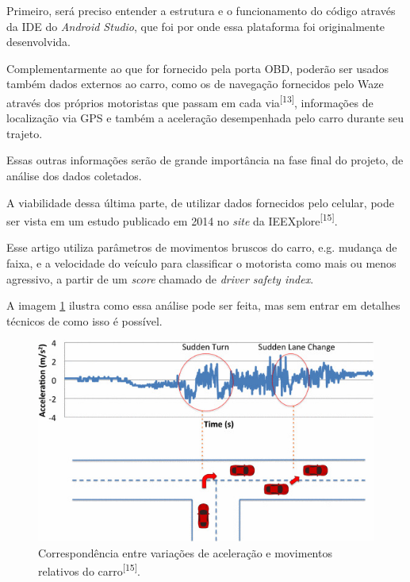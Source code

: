 Primeiro, será preciso entender a estrutura e o funcionamento do código através da IDE do \textit{Android Studio}, que foi por onde essa plataforma foi originalmente desenvolvida.

Complementarmente ao que for fornecido pela porta OBD, poderão ser usados também dados externos ao carro, como os de navegação fornecidos pelo Waze através dos próprios motoristas que passam em cada via\textsuperscript{[13]}, informações de localização via GPS e também a aceleração desempenhada pelo carro durante seu trajeto.

Essas outras informações serão de grande importância na fase final do projeto, de análise dos dados coletados.

A viabilidade dessa última parte, de utilizar dados fornecidos pelo celular, pode ser vista em um estudo publicado em 2014 no \textit{site} da IEEXplore\textsuperscript{[15]}.

Esse artigo utiliza parâmetros de movimentos bruscos do carro, e.g. mudança de faixa, e a velocidade do veículo para classificar o motorista como mais ou menos agressivo, a partir de um \textit{score} chamado de \textit{driver safety index}.

A imagem \ref{fig:sudden_acc_car} ilustra como essa análise pode ser feita, mas sem entrar em detalhes técnicos de como isso é possível.

\begin{figure}[hp]
    \centering
    
    \includegraphics[scale=0.6]{figures/sudden_acc_car.jpg}
    
    \caption{Correspondência entre variações de aceleração e movimentos relativos do carro\textsuperscript{[15]}.}
    
    \label{fig:sudden_acc_car}
\end{figure}

